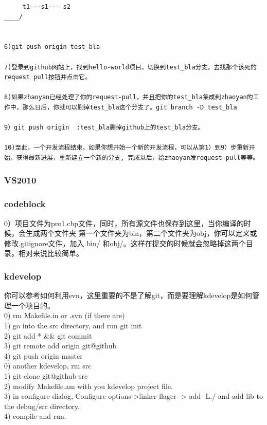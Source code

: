 \documentclass[a4paper,12pt,twoside]{book}
\begin{document}
\begin{CJK*}{UTF8}{song}
\begin{verbatim}
     t1---s1--- s2
____/


6)git push origin test_bla

7)登录到github网站上，找到hello-world项目，切换到test_bla分支。去找那个该死的request pull按钮并点击它。

8)如果zhaoyan已经处理了你的request-pull，并且把你的test_bla集成到zhaoyan的工作中，那么日后，你就可以删掉test_bla这个分支了。git branch -D test_bla

9）git push origin  :test_bla删掉github上的test_bla分支。

10)至此，一个开发流程结束，如果你想开始一个新的开发流程，可以从第1）到9）步重新开始，获得最新进展，重新建立一个新的分支, 完成以后，给zhaoyan发request-pull等等。
\end{verbatim}

\subsubsection{VS2010}


\subsubsection{codeblock}
0）项目文件为pro1.cbp文件，同时，所有源文件也保存到这里，当你编译的时候，会生成两个文件夹
第一个文件夹为bin，第二个文件夹为obj，你可以定义或修改.gitignore文件，加入 bin/ 和obj/。这样在提交的时候就会忽略掉这两个目录。相对来说比较简单。

\subsubsection{kdevelop}
你可以参考如何利用svn，这里重要的不是了解git，而是要理解kdevelop是如何管理一个项目的。\\
0) rm Makefile.in or .svn (if there are) \\
1) go into the src directory, and run git init \\
2) git add * \&\& git commit \\
3) git remote add origin git@github \\
4) git push origin master \\

0) another kdevelop, rm src\\
1) git clone git@github src\\
2) modify Makefile.am with you kdevelop project file.\\
3) in configure dialog, Configure options->linker flager -> add -L./ and add lib to the debug/src directory.\\
4) compile and run.\\


\end{CJK*}
\end{document}
